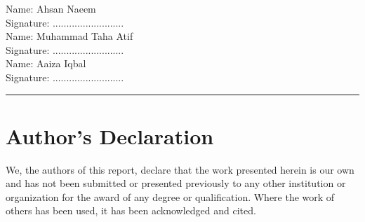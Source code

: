 \documentclass{FastFyp}
\begin{document}
\begin{flushright}
Name: Ahsan Naeem
\\[3ex]
Signature: ..........................
\\[6ex]
Name: Muhammad Taha Atif
\\[3ex]
Signature: ..........................
\\[6ex]
Name: Aaiza Iqbal
\\[3ex]
Signature: ..........................
\end{flushright}

\vspace{3 cm}
\hrule

\section*{Author's Declaration}
We, the authors of this report, declare that the work presented herein is our own and has not been submitted or presented previously to any other institution or organization for the award of any degree or qualification. Where the work of others has been used, it has been acknowledged and cited.
\pagebreak



\pagestyle{fancy}
\tableofcontents
\pagebreak
{}
\listoffigures
\pagebreak
{}
{\setlength{\cftbeforetabskip}{3pt}\listoftables}

\mainmatter








\clearpage
{}
{


}
\end{document}
